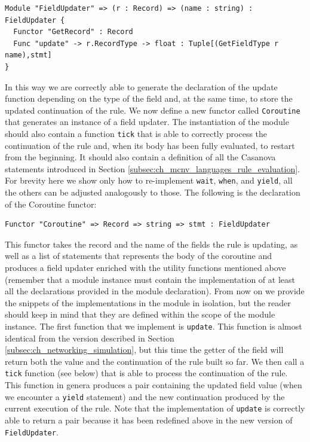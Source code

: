 \begin{lstlisting}
Module "FieldUpdater" => (r : Record) => (name : string) : FieldUpdater {
  Functor "GetRecord" : Record
  Func "update" -> r.RecordType -> float : Tuple[(GetFieldType r name),stmt]
}
\end{lstlisting}

\noindent
In this way we are correctly able to generate the declaration of the update function depending on the type of the field and, at the same time, to store the updated continuation of the rule. We now define a new functor called \texttt{Coroutine} that generates an instance of a field updater. The instantiation of the module should also contain a function \texttt{tick} that is able to correctly process the continuation of the rule and, when its body has been fully evaluated, to restart from the beginning. It should also contain a definition of all the Casanova statements introduced in Section \ref{subsec:ch_mcnv_languages_rule_evaluation}. For brevity here we show only how to re-implement \texttt{wait}, \texttt{when}, and \texttt{yield}, all the others can be adjusted analogously to those. The following is the declaration of the Coroutine functor:

\begin{lstlisting}
Functor "Coroutine" => Record => string => stmt : FieldUpdater
\end{lstlisting}

\noindent
This functor takes the record and the name of the fields the rule is updating, as well as a list of statements that represents the body of the coroutine and produces a field updater enriched with the utility functions mentioned above (remember that a module instance must contain the implementation of at least all the declarations provided in the module declaration). From now on we provide the snippets of the implementations in the module in isolation, but the reader should keep in mind that they are defined within the scope of the module instance. The first function that we implement is \texttt{update}. This function is almost identical from the version described in Section \ref{subsec:ch_networking_simulation}, but this time the getter of the field will return both the value and the continuation of the rule built so far. We then call a \texttt{tick} function (see below) that is able to process the continuation of the rule. This function in genera produces a pair containing the updated field value (when we encounter a \texttt{yield} statement) and the new continuation produced by the current execution of the rule. Note that the implementation of \texttt{update} is correctly able to return a pair because it has been redefined above in the new version of \texttt{FieldUpdater}.

